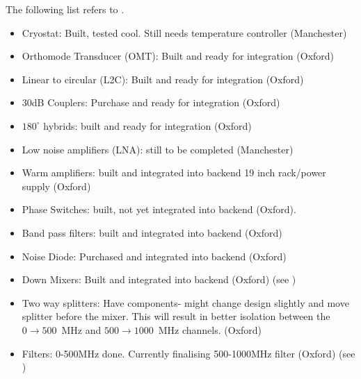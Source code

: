The following list refers to .
\begin{itemize}
 \item Cryostat: Built, tested cool. Still needs temperature controller (Manchester)
 \item Orthomode Transducer (OMT): Built and ready for integration (Oxford)
 \item Linear to circular (L2C): Built and ready for integration (Oxford)
 \item 30dB  Couplers: Purchase and ready for integration (Oxford)
 \item $180^{\circ}$ hybrids: built and ready for integration (Oxford)
 \item Low noise amplifiers (LNA): still to be completed (Manchester)
 \item Warm amplifiers: built and integrated into backend 19 inch rack/power supply (Oxford)
 \item Phase Switches: built, not yet integrated into backend (Oxford).
 \item Band pass filters: built and integrated into backend (Oxford)
 \item Noise Diode: Purchased and integrated into backend (Oxford)
 \item Down Mixers: Built and integrated into backend (Oxford) (see )
 \item Two way splitters: Have components- might change design slightly and move splitter before the mixer. This will result in better isolation between the $0\rightarrow500$~MHz and $500\rightarrow1000$~MHz channels. (Oxford)
 \item Filters: 0-500MHz done. Currently finalising 500-1000MHz filter (Oxford) (see )

\end{itemize}








